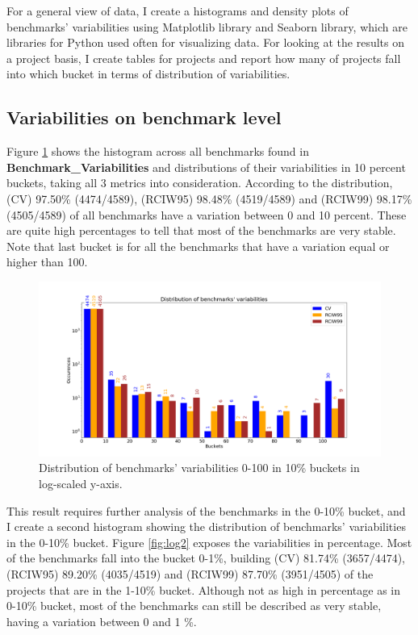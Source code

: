 \documentclass{seal_thesis}
\begin{document}
\noindent For a general view of data, I create a histograms and density plots of benchmarks' variabilities using Matplotlib library \cite{Matplotlib} and Seaborn library\cite{Seaborn}, which are libraries for Python used often for visualizing data. For looking at the results on a project basis, I create tables for projects and report how many of projects fall into which bucket in terms of distribution of variabilities.

\subsection{Variabilities on benchmark level}
	

\noindent Figure \ref{fig:log1} shows the histogram across all benchmarks found in \textbf{Benchmark\_Variabilities} and distributions of their variabilities in 10 percent buckets, taking all 3 metrics into consideration. According to the distribution, (CV) 97.50\% (4474/4589), (RCIW95) 98.48\% (4519/4589) and (RCIW99) 98.17\% (4505/4589) of all benchmarks have a variation between 0 and 10 percent. These are quite high percentages to tell that most of the benchmarks are very stable. Note that last bucket is for all the benchmarks that have a variation equal or higher than 100.

\clearpage

\begin{figure}[H]
	\centering
	\includegraphics[width=\linewidth]{resultsvis/log1}
	\caption{Distribution of benchmarks' variabilities 0-100 in 10\% buckets in log-scaled y-axis.}
	\label{fig:log1}
\end{figure}

\noindent This result requires further analysis of the benchmarks in the 0-10\% bucket, and I create a second histogram showing the distribution of benchmarks' variabilities in the 0-10\% bucket. Figure \ref{fig:log2} exposes the variabilities in percentage. Most of the benchmarks fall into the bucket 0-1\%, building (CV) 81.74\% (3657/4474), (RCIW95) 89.20\% (4035/4519) and (RCIW99) 87.70\% (3951/4505) of the projects that are in the 1-10\% bucket. Although not as high in percentage as in 0-10\% bucket, most of the benchmarks can still be described as very stable, having a variation between 0 and 1 \%.
\end{document}
